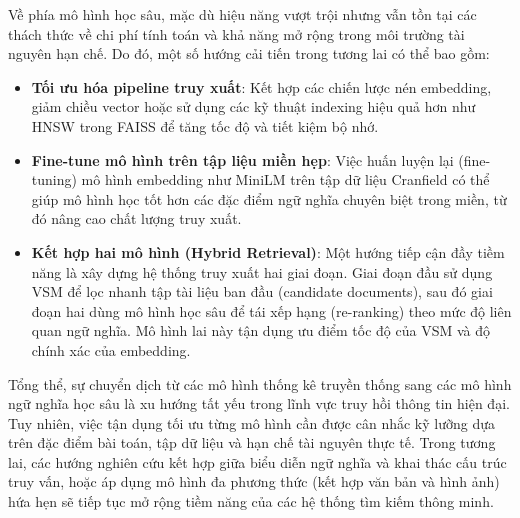 Về phía mô hình học sâu, mặc dù hiệu năng vượt trội nhưng vẫn tồn tại các thách thức về chi phí tính toán và khả năng mở rộng trong môi trường tài nguyên hạn chế. Do đó, một số hướng cải tiến trong tương lai có thể bao gồm:

\begin{itemize}
    \item \textbf{Tối ưu hóa pipeline truy xuất}: Kết hợp các chiến lược nén embedding, giảm chiều vector hoặc sử dụng các kỹ thuật indexing hiệu quả hơn như HNSW trong FAISS để tăng tốc độ và tiết kiệm bộ nhớ.
    \item \textbf{Fine-tune mô hình trên tập liệu miền hẹp}: Việc huấn luyện lại (fine-tuning) mô hình embedding như MiniLM trên tập dữ liệu Cranfield có thể giúp mô hình học tốt hơn các đặc điểm ngữ nghĩa chuyên biệt trong miền, từ đó nâng cao chất lượng truy xuất.

    \item \textbf{Kết hợp hai mô hình (Hybrid Retrieval)}: Một hướng tiếp cận đầy tiềm năng là xây dựng hệ thống truy xuất hai giai đoạn. Giai đoạn đầu sử dụng VSM để lọc nhanh tập tài liệu ban đầu (candidate documents), sau đó giai đoạn hai dùng mô hình học sâu để tái xếp hạng (re-ranking) theo mức độ liên quan ngữ nghĩa. Mô hình lai này tận dụng ưu điểm tốc độ của VSM và độ chính xác của embedding.
\end{itemize}

Tổng thể, sự chuyển dịch từ các mô hình thống kê truyền thống sang các mô hình ngữ nghĩa học sâu là xu hướng tất yếu trong lĩnh vực truy hồi thông tin hiện đại. Tuy nhiên, việc tận dụng tối ưu từng mô hình cần được cân nhắc kỹ lưỡng dựa trên đặc điểm bài toán, tập dữ liệu và hạn chế tài nguyên thực tế. Trong tương lai, các hướng nghiên cứu kết hợp giữa biểu diễn ngữ nghĩa và khai thác cấu trúc truy vấn, hoặc áp dụng mô hình đa phương thức (kết hợp văn bản và hình ảnh) hứa hẹn sẽ tiếp tục mở rộng tiềm năng của các hệ thống tìm kiếm thông minh.
